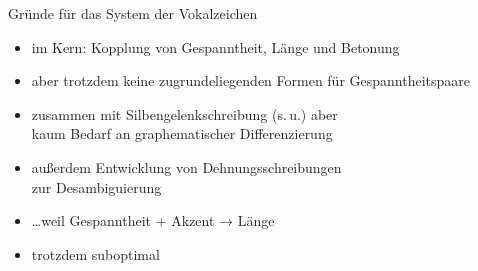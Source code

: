 



\begin{frame}
  {Gründe für das System der Vokalzeichen}
  \pause
  \begin{itemize}[<+->]
    \item im Kern: \alert{Kopplung von Gespanntheit, Länge und Betonung}
    \item aber trotzdem \alert{keine zugrundeliegenden Formen} für Gespanntheitspaare
    \item zusammen mit \alert{Silbengelenkschreibung} (s.\,u.) aber\\
      kaum Bedarf an graphematischer Differenzierung
      \Halbzeile
    \item außerdem Entwicklung von \alert{Dehnungsschreibungen}\\
      zur Desambiguierung
    \item \ldots weil \alert{Gespanntheit + Akzent → Länge}
      \Halbzeile
    \item trotzdem suboptimal
  \end{itemize}
\end{frame}

